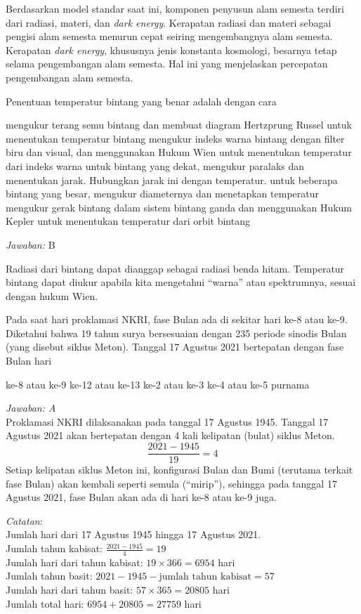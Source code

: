 \documentclass[11pt,fleqn]{exam}
\begin{document}
\begin{questions}
Berdasarkan model standar saat ini, komponen penyusun alam semesta terdiri dari radiasi, materi, dan \textit{dark energy}. Kerapatan radiasi dan materi sebagai pengisi alam semesta menurun cepat seiring mengembangnya alam semesta. Kerapatan \textit{dark energy}, khususnya jenis konstanta kosmologi, besarnya tetap selama pengembangan alam semesta. Hal ini yang menjelaskan percepatan pengembangan alam semesta.

\question Penentuan temperatur bintang yang benar adalah dengan cara
\begin{choices}
\choice mengukur terang semu bintang dan membuat diagram Hertzprung Russel untuk menentukan temperatur bintang
\choice mengukur indeks warna bintang dengan filter biru dan visual, dan menggunakan Hukum Wien untuk menentukan temperatur dari indeks warna
\choice untuk bintang yang dekat, mengukur paralaks dan menentukan jarak. Hubungkan jarak ini dengan temperatur.
\choice untuk beberapa bintang yang besar, mengukur diameternya dan menetapkan temperatur
\choice mengukur gerak bintang dalam sistem bintang ganda dan menggunakan Hukum Kepler untuk menentukan temperatur dari orbit bintang
\end{choices}

\textit{Jawaban:} B

Radiasi dari bintang dapat dianggap sebagai radiasi benda hitam. Temperatur bintang dapat diukur apabila kita mengetahui ``warna'' atau spektrumnya, sesuai dengan hukum Wien.



\question Pada saat hari proklamasi NKRI, fase Bulan ada di sekitar hari ke-8 atau ke-9. Diketahui bahwa 19 tahun surya bersesuaian dengan 235 periode sinodis Bulan (yang disebut siklus Meton). Tanggal 17 Agustus 2021 bertepatan dengan fase Bulan hari
\begin{choices}
\choice ke-8 atau ke-9
\choice ke-12 atau ke-13
\choice ke-2 atau ke-3
\choice ke-4 atau ke-5
\choice purnama
\end{choices}

\textit{Jawaban: A}\\
Proklamasi NKRI dilaksanakan pada tanggal 17 Agustus 1945. Tanggal 17 Agustus 2021 akan bertepatan dengan 4 kali kelipatan (bulat) siklus Meton.
$$\frac{2021-1945}{19} = 4$$
Setiap kelipatan siklus Meton ini, konfigurasi Bulan dan Bumi (terutama terkait fase Bulan) akan kembali seperti semula (``mirip''), sehingga pada tanggal 17 Agustus 2021, fase Bulan akan ada di hari ke-8 atau ke-9 juga.


\textit{Catatan}:\\
Jumlah hari dari 17 Agustus 1945 hingga 17 Agustus 2021.\\
Jumlah tahun kabisat: $\frac{2021-1945}{4}=19$\\
Jumlah hari dari tahun kabisat: $19\times 366=6954$ hari\\
Jumlah tahun basit: $2021-1945-\text{jumlah tahun kabisat}=57$\\
Jumlah hari dari tahun basit: $57\times 365=20805$ hari\\
Jumlah total hari: $6954+20805=27759$ hari\\


\end{questions}
\end{document}

